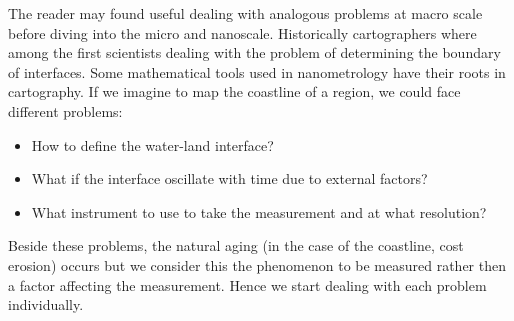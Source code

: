 The reader may found useful dealing with analogous problems at macro scale before diving into the micro and nanoscale.  Historically cartographers where among the first scientists dealing with the problem of determining the boundary of interfaces. Some mathematical tools used in nanometrology have their roots in cartography.%
If we imagine to map the coastline of a region, we could face different problems:
\begin{itemize}
    \item How to define the water-land interface?
    \item What if the interface oscillate with time due to external factors?
    \item What instrument to use to take the measurement and at what resolution?
\end{itemize}
Beside these problems, the natural aging (in the case of the coastline, cost erosion) occurs but we consider this the phenomenon to be measured rather then a factor affecting the measurement. Hence we start dealing with each problem individually.   

